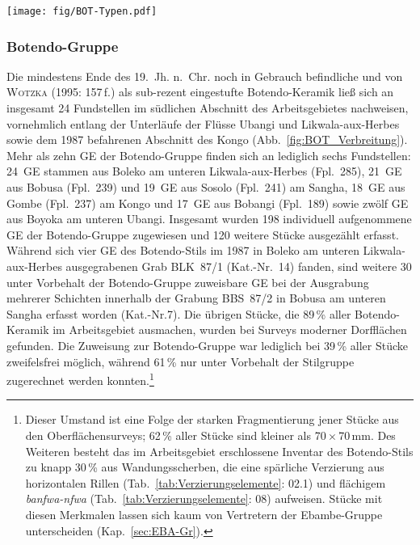 \begin{figure*}[tb]
	\centering
	\texttt{[image: fig/BOT-Typen.pdf]}
	\caption{Botendo-Gruppe: Typvertreter.\\1:~Taf.~71.2; 2:~Taf.~2.2; 3:~Taf.~4.4; 4:~Taf.~3.14; 5:~Taf.~34.8; 6:~Taf.~32.15; 7:~Taf.~68.5.}\label{fig:BOT_Typverteter}
\end{figure*}

\subsubsection{Botendo-Gruppe}\label{sec:BOT-Gr}

Die mindestens Ende des 19.~Jh. n.~Chr. noch in Gebrauch befindliche und von \textsc{Wotzka} (1995: 157\,f.) als sub-rezent eingestufte Botendo-Keramik ließ sich an insgesamt 24 Fundstellen im südlichen Abschnitt des Arbeitsgebietes nachweisen, vornehmlich entlang der Unterläufe der Flüsse \mbox{Ubangi} und \mbox{Likwala}-\mbox{aux}-\mbox{Herbes} sowie dem 1987 befahrenen Abschnitt des Kongo (Abb.~\ref{fig:BOT_Verbreitung}). Mehr als zehn GE der Botendo-Gruppe finden sich an lediglich sechs Fundstellen: 24~GE stammen aus Boleko am unteren \mbox{Likwala}-\mbox{aux}-\mbox{Herbes} (Fpl.~285), 21~GE aus Bobusa (Fpl.~239) und 19~GE aus Sosolo (Fpl.~241) am \mbox{Sangha}, 18~GE aus Gombe (Fpl.~237) am Kongo und 17~GE aus Bobangi (Fpl.~189) sowie zwölf GE aus Boyoka am unteren \mbox{Ubangi}. Insgesamt wurden 198 individuell aufgenommene GE der Botendo-Gruppe zugewiesen und 120 weitere Stücke ausgezählt erfasst. Während sich vier GE des Botendo-Stils im 1987 in Boleko am unteren \mbox{Likwala}-\mbox{aux}-\mbox{Herbes} ausgegrabenen Grab BLK~87/1 (Kat.-Nr.~14) fanden, sind weitere 30 unter Vorbehalt der Botendo-Gruppe zuweisbare GE bei der Ausgrabung mehrerer Schichten innerhalb der Grabung BBS~87/2 in Bobusa am unteren \mbox{Sangha} erfasst worden (Kat.-Nr.7). Die übrigen Stücke, die 89\,\% aller Botendo-Keramik im Arbeitsgebiet ausmachen, wurden bei Surveys moderner Dorfflächen gefunden. Die Zuweisung zur Botendo-Gruppe war lediglich bei 39\,\% aller Stücke zweifelsfrei möglich, während 61\,\% nur unter Vorbehalt der Stilgruppe zugerechnet werden konnten.\footnote{Dieser Umstand ist eine Folge der starken Fragmentierung jener Stücke aus den Oberflächensurveys; 62\,\% aller Stücke sind kleiner als 70\,$\times$\,70\,mm. Des Weiteren besteht das im Arbeitsgebiet erschlossene Inventar des Botendo-Stils zu knapp 30\,\% aus Wandungsscherben, die eine spärliche Verzierung aus horizontalen Rillen (Tab.~\ref{tab:Verzierungselemente}: 02.1) und flächigem \textit{banfwa-nfwa} (Tab.~\ref{tab:Verzierungselemente}: 08) aufweisen. Stücke mit diesen Merkmalen lassen sich kaum von Vertretern der Ebambe-Gruppe unterscheiden (Kap.~\ref{sec:EBA-Gr}).}

